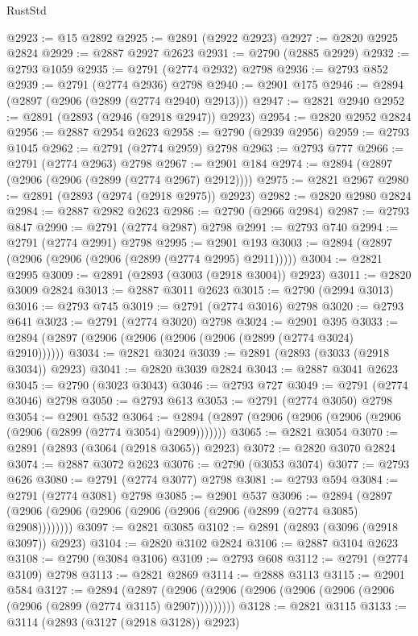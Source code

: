 \begin{lexlean}{RustStd}
\begin{coremodule}
@2923 := @15 @2892
@2925 := @2891 (@2922 @2923)
@2927 := @2820 @2925 @2824
@2929 := @2887 @2927 @2623
@2931 := @2790 (@2885 @2929)
@2932 := @2793 @1059
@2935 := @2791 (@2774 @2932) @2798
@2936 := @2793 @852
@2939 := @2791 (@2774 @2936) @2798
@2940 := @2901 @175
@2946 := @2894 (@2897 (@2906 (@2899 (@2774 @2940) @2913)))
@2947 := @2821 @2940
@2952 := @2891 (@2893 (@2946 (@2918 @2947)) @2923)
@2954 := @2820 @2952 @2824
@2956 := @2887 @2954 @2623
@2958 := @2790 (@2939 @2956)
@2959 := @2793 @1045
@2962 := @2791 (@2774 @2959) @2798
@2963 := @2793 @777
@2966 := @2791 (@2774 @2963) @2798
@2967 := @2901 @184
@2974 := @2894 (@2897 (@2906 (@2906 (@2899 (@2774 @2967) @2912))))
@2975 := @2821 @2967
@2980 := @2891 (@2893 (@2974 (@2918 @2975)) @2923)
@2982 := @2820 @2980 @2824
@2984 := @2887 @2982 @2623
@2986 := @2790 (@2966 @2984)
@2987 := @2793 @847
@2990 := @2791 (@2774 @2987) @2798
@2991 := @2793 @740
@2994 := @2791 (@2774 @2991) @2798
@2995 := @2901 @193
@3003 := @2894 (@2897 (@2906 (@2906 (@2906 (@2899 (@2774 @2995) @2911)))))
@3004 := @2821 @2995
@3009 := @2891 (@2893 (@3003 (@2918 @3004)) @2923)
@3011 := @2820 @3009 @2824
@3013 := @2887 @3011 @2623
@3015 := @2790 (@2994 @3013)
@3016 := @2793 @745
@3019 := @2791 (@2774 @3016) @2798
@3020 := @2793 @641
@3023 := @2791 (@2774 @3020) @2798
@3024 := @2901 @395
@3033 := @2894 (@2897 (@2906 (@2906 (@2906 (@2906 (@2899 (@2774 @3024) @2910))))))
@3034 := @2821 @3024
@3039 := @2891 (@2893 (@3033 (@2918 @3034)) @2923)
@3041 := @2820 @3039 @2824
@3043 := @2887 @3041 @2623
@3045 := @2790 (@3023 @3043)
@3046 := @2793 @727
@3049 := @2791 (@2774 @3046) @2798
@3050 := @2793 @613
@3053 := @2791 (@2774 @3050) @2798
@3054 := @2901 @532
@3064 := @2894 (@2897 (@2906 (@2906 (@2906 (@2906 (@2906 (@2899 (@2774 @3054) @2909)))))))
@3065 := @2821 @3054
@3070 := @2891 (@2893 (@3064 (@2918 @3065)) @2923)
@3072 := @2820 @3070 @2824
@3074 := @2887 @3072 @2623
@3076 := @2790 (@3053 @3074)
@3077 := @2793 @626
@3080 := @2791 (@2774 @3077) @2798
@3081 := @2793 @594
@3084 := @2791 (@2774 @3081) @2798
@3085 := @2901 @537
@3096 := @2894 (@2897 (@2906 (@2906 (@2906 (@2906 (@2906 (@2906 (@2899 (@2774 @3085) @2908))))))))
@3097 := @2821 @3085
@3102 := @2891 (@2893 (@3096 (@2918 @3097)) @2923)
@3104 := @2820 @3102 @2824
@3106 := @2887 @3104 @2623
@3108 := @2790 (@3084 @3106)
@3109 := @2793 @608
@3112 := @2791 (@2774 @3109) @2798
@3113 := @2821 @2869
@3114 := @2888 @3113
@3115 := @2901 @584
@3127 := @2894
    (@2897 (@2906 (@2906 (@2906 (@2906 (@2906 (@2906 (@2906 (@2899 (@2774 @3115) @2907)))))))))
@3128 := @2821 @3115
@3133 := @3114 (@2893 (@3127 (@2918 @3128)) @2923)

\end{coremodule}
\end{lexlean}
